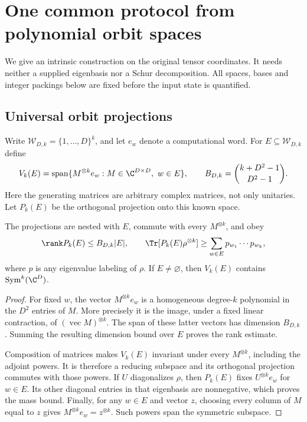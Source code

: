 \section{One common protocol from polynomial orbit spaces}\label{sec:universal}

We give an intrinsic construction on the original tensor coordinates. It needs neither a supplied eigenbasis nor a Schur decomposition. All spaces, bases and integer packings below are fixed before the input state is quantified.

\subsection{Universal orbit projections}
Write $\mathcal W_{D,k}=\{1,\ldots,D\}^k$, and let $e_w$ denote a computational word. For $E\subseteq\mathcal W_{D,k}$ define
\begin{equation}\label{eq:orbit-space}
 V_k(E)=\operatorname{span}\{M^{\otimes k}e_w:M\in\C^{D\times D},\ w\in E\},
 \qquad B_{D,k}=\binom{k+D^2-1}{D^2-1}.
\end{equation}
Here the generating matrices are arbitrary complex matrices, not only unitaries. Let $P_k(E)$ be the orthogonal projection onto this known space.

\begin{lemma}\label{lem:orbit}
The projections are nested with $E$, commute with every $M^{\otimes k}$, and obey
\begin{equation}\label{eq:orbit-bound}
 \rank P_k(E)\le B_{D,k}|E|,\qquad
 \Tr[P_k(E)\rho^{\otimes k}]\ge\sum_{w\in E}p_{w_1}\cdots p_{w_k},
\end{equation}
where $p$ is any eigenvalue labeling of $\rho$. If $E\ne\varnothing$, then $V_k(E)$ contains $\operatorname{Sym}^k(\C^D)$.
\end{lemma}
\begin{proof}
For fixed $w$, the vector $M^{\otimes k}e_w$ is a homogeneous degree-$k$ polynomial in the $D^2$ entries of $M$. More precisely it is the image, under a fixed linear contraction, of $(\operatorname{vec}M)^{\otimes k}$. The span of these latter vectors has dimension $B_{D,k}$. Summing the resulting dimension bound over $E$ proves the rank estimate.

Composition of matrices makes $V_k(E)$ invariant under every $M^{\otimes k}$, including the adjoint powers. It is therefore a reducing subspace and its orthogonal projection commutes with those powers. If $U$ diagonalizes $\rho$, then $P_k(E)$ fixes $U^{\otimes k}e_w$ for $w\in E$. Its other diagonal entries in that eigenbasis are nonnegative, which proves the mass bound. Finally, for any $w\in E$ and vector $z$, choosing every column of $M$ equal to $z$ gives $M^{\otimes k}e_w=z^{\otimes k}$. Such powers span the symmetric subspace.
\end{proof}

